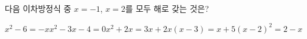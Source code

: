 다음 이차방정식 중 $x=-1$, $x=2$를 모두 해로 갖는 것은?
\begin{choicesii}{$x^2-6=-x$}{$x^2-3x-4=0$}{$x^2+2x=3x+2$}{$x(x-3)=x+5$}{$(x-2)^2=2-x$}\end{choicesii}
